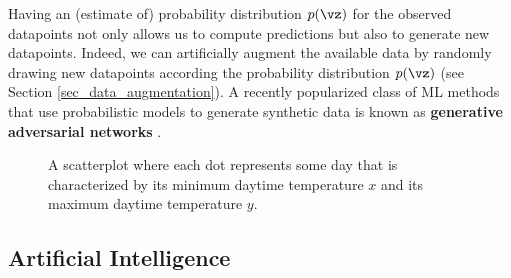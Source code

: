 \documentclass[12pt]{report}
\newcommand{\boundellipse}[3]%
{(#1) ellipse (#2 and #3)
}
\begin{document}
Having an (estimate of) probability distribution $p(\vz)$ for the observed 
datapoints not only allows us to compute predictions but also to generate 
new datapoints. Indeed, we can artificially augment the available data  
by randomly drawing new datapoints according the probability distribution $p(\vz)$ 
(see Section \ref{sec_data_augmentation}). A recently popularized class of 
ML methods that use probabilistic models to generate synthetic data  
is known as {\bf generative adversarial networks} \cite{GoodfellowGAN}. 



\begin{figure}[htbp]
	\begin{center}
		\vspace*{-14mm}
	\end{center}
	\caption{A scatterplot where each dot represents some day that is characterized 
		by its minimum daytime temperature $x$ and its maximum daytime temperature $y$.}
	\label{fig_scatterplot_temp_FMI_stat_model}
	\vspace*{-3mm}
\end{figure}




\subsection{Artificial Intelligence}
\end{document}
